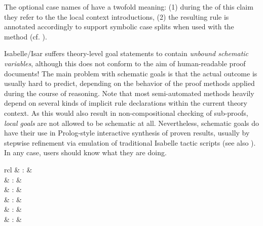 \begin{isabellebody}
\begin{isamarkuptext}
  The optional case names of \hyperlink{element.obtains}{\mbox{}} have a twofold
  meaning: (1) during the of this claim they refer to the the local
  context introductions, (2) the resulting rule is annotated
  accordingly to support symbolic case splits when used with the
  \hyperlink{method.cases}{\mbox{}} method (cf.  ).

  \medskip

  \begin{warn}
    Isabelle/Isar suffers theory-level goal statements to contain
    \emph{unbound schematic variables}, although this does not conform
    to the aim of human-readable proof documents!  The main problem
    with schematic goals is that the actual outcome is usually hard to
    predict, depending on the behavior of the proof methods applied
    during the course of reasoning.  Note that most semi-automated
    methods heavily depend on several kinds of implicit rule
    declarations within the current theory context.  As this would
    also result in non-compositional checking of sub-proofs,
    \emph{local goals} are not allowed to be schematic at all.
    Nevertheless, schematic goals do have their use in Prolog-style
    interactive synthesis of proven results, usually by stepwise
    refinement via emulation of traditional Isabelle tactic scripts
    (see also ).  In any case, users
    should know what they are doing.
  \end{warn}%
\end{isamarkuptext}%
\isamarkuptrue%
%
\isamarkuptrue%
%
\begin{isamarkuptext}%
\begin{matharray}{rcl}
    \hypertarget{command.proof}{\hyperlink{command.proof}{\mbox{}}} & : &  \\
    \hypertarget{command.qed}{\hyperlink{command.qed}{\mbox{}}} & : &  \\
    \hypertarget{command.by}{\hyperlink{command.by}{\mbox{}}} & : &  \\
    \hypertarget{command.ddot}{\hyperlink{command.ddot}{\mbox{\isa{\isacommand{{\isachardot}{\isachardot}}}}}} & : &  \\
    \hypertarget{command.dot}{\hyperlink{command.dot}{\mbox{\isa{\isacommand{{\isachardot}}}}}} & : &  \\
    \hypertarget{command.sorry}{\hyperlink{command.sorry}{\mbox{}}} & : &  \\
  \end{matharray}


\end{isamarkuptext}
\end{isabellebody}
